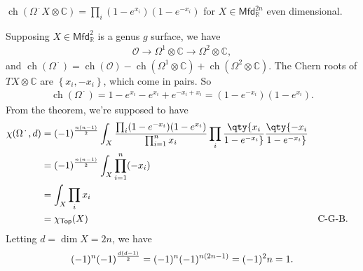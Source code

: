 \begin{exercise}

\(\operatorname{ch}( {\Omega}^{{\,\cdot\,}}X \otimes{\mathbb{C}}) = \prod_i (1-e^{x_i}) (1 - e^{-x_i})\)
for \(X\in {\mathsf{Mfd}}_{\mathbb{R}}^{2n}\) even dimensional.

\end{exercise}

\begin{example}[?]

Supposing \(X\in {\mathsf{Mfd}}_{\mathbb{R}}^2\) is a genus \(g\)
surface, we have
\begin{align*}
{\mathcal{O}}\to \Omega^1\otimes{\mathbb{C}}\to \Omega^2 \otimes{\mathbb{C}}
,\end{align*}
and
\(\operatorname{ch}({ \Omega }^{{\,\cdot\,}}) = \operatorname{ch}( {\mathcal{O}}) - \operatorname{ch}( \Omega^1 \otimes{\mathbb{C}}) + \operatorname{ch}(\Omega^2\otimes{\mathbb{C}})\).
The Chern roots of \(TX \otimes{\mathbb{C}}\) are
\(\left\{{ x_i, -x_i }\right\}\), which come in pairs. So
\begin{align*}
\operatorname{ch}( {\Omega}^{{\,\cdot\,}} ) 
= 1 - e^{x_i} - e^{x_i} + e^{-x_i + x_i}
= (1 - e^{-x_i})( 1 - e^{x_i} )
.\end{align*}
From the theorem, we're supposed to have
\begin{align*}
\chi( {\Omega}^{{\,\cdot\,}}, d) 
&= 
(-1)^{n(n-1) \over 2}
\int_X
{\prod_i (1 - e^{-x_i})( 1 - e^{x_i} ) \over \prod_{i=1}^n x_i }
\prod_i 
\qty{x_i \over 1 - e^{-x_i}} 
\qty{-x_i \over 1 - e^{-x_i}} \\
&= 
(-1)^{n(n-1) \over 2}
\int_X
\prod_{i=1}^n (-x_i)\\
& = \int_X 
\prod_i x_i \\
&=
\chi_{\mathsf{Top}}(X) && \text{C-G-B}
.\end{align*}
Letting \(d=\dim X = 2n\), we have
\begin{align*}
(-1)^n (-1)^{d(d-1) \over 2} = (-1)^n (-1)^{n(2n-1)} = (-1)^2n = 1 .
\end{align*}

\end{example}

